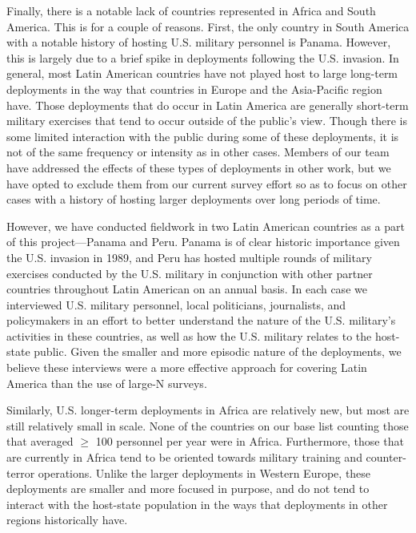 \documentclass[12pt]{article}
\begin{document}
Finally, there is a notable lack of countries represented in Africa and South America. This is for a couple of reasons. First, the only country in South America with a notable history of hosting U.S. military personnel is Panama. However, this is largely due to a brief spike in deployments following the U.S. invasion. In general, most Latin American countries have not played host to large long-term deployments in the way that countries in Europe and the Asia-Pacific region have. Those deployments that do occur in Latin America are generally short-term military exercises that tend to occur outside of the public's view. Though there is some limited interaction with the public during some of these deployments, it is not of the same frequency or intensity as in other cases. Members of our team have addressed the effects of these types of deployments in other work, but we have opted to exclude them from our current survey effort so as to focus on other cases with a history of hosting larger deployments over long periods of time. 

However, we have conducted fieldwork in two Latin American countries as a part of this project---Panama and Peru. Panama is of clear historic importance given the U.S. invasion in 1989, and Peru has hosted multiple rounds of military exercises conducted by the U.S. military in conjunction with other partner countries throughout Latin American on an annual basis. In each case we interviewed U.S. military personnel, local politicians, journalists, and policymakers in an effort to better understand the nature of the U.S. military's activities in these countries, as well as how the U.S. military relates to the host-state public. Given the smaller and more episodic nature of the deployments, we believe these interviews were a more effective approach for covering Latin America than the use of large-N surveys.

Similarly, U.S. longer-term deployments in Africa are relatively new, but most are still relatively small in scale. None of the countries on our base list counting those that averaged $\geq$ 100 personnel per year were in Africa. Furthermore, those that are currently in Africa tend to be oriented towards military training and counter-terror operations. Unlike the larger deployments in Western Europe, these deployments are smaller and more focused in purpose, and do not tend to interact with the host-state population in the ways that deployments in other regions historically have.


\clearpage
\end{document}
